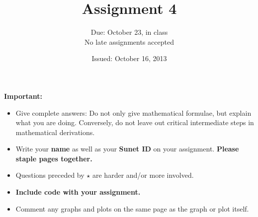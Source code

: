 \documentclass{article}
\title{Assignment 4}
\date{Issued: October 16, 2013}
\author{Due: October 23, in class\\
No late assignments accepted}
\begin{document}
\maketitle
\thispagestyle{fancy}
\textbf{Important:}
\begin{itemize}
\item Give complete answers: Do not only give mathematical formulae, but explain what you are doing. Conversely, do not leave out critical intermediate steps in mathematical derivations.
\item Write your \textbf{name} as well as your \textbf{Sunet ID} on your assignment. \textbf{Please staple pages together.}
\item Questions preceded by  $\star$  are harder and/or more involved.
\item \textbf{Include code with your assignment.}
\item Comment any graphs and plots on the same page as the graph or plot itself.
\end{itemize}
\end{document}

